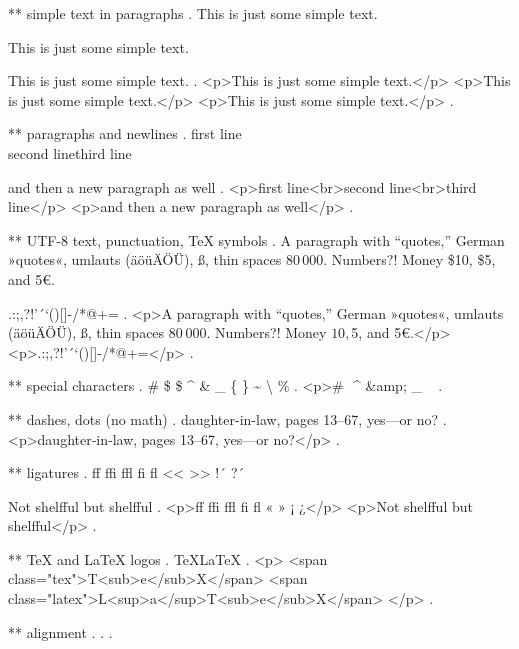 ** simple text in paragraphs
.
This is just some simple text.

This is just some simple text.

This is just some simple text.
.
<p>This is just some simple text.</p>
<p>This is just some simple text.</p>
<p>This is just some simple text.</p>
.

** paragraphs and newlines
.
first line\\second line\newline third line\par and then a new paragraph as well
.
<p>ﬁrst line<br>second line<br>third line</p>
<p>and then a new paragraph as well</p>
.


** UTF-8 text, punctuation, TeX symbols
.
A para\-graph with “quotes,” German »quotes«, umlauts (äöüÄÖÜ), ß, thin spaces 80\,000. Numbers?! Money \$10, \$5, and 5€.

.:;,?!'´`()[]-/*@+=
.
<p>A paragraph with “quotes,” German »quotes«, umlauts (äöüÄÖÜ), ß, thin spaces 80 000. Numbers?! Money $10, $5, and 5€.</p>
<p>.:;,?!'´`()[]‐/*@+=</p>
.


** special characters
.
\# \$ \$ \^{} \& \_ \{ \} \~{} \textbackslash{} \%
.
<p># $ $ ^​ &amp; _ { } ~​ \​ %
.


** dashes, dots (no math)
.
daughter-in-law, pages 13--67, yes---or no?
.
<p>daughter‐in‐law, pages 13–67, yes—or no?</p>
.


** ligatures
.
ff ffi ffl fi fl << >> !´ ?´

Not shelfful but shelf\mbox{}ful
.
<p>ﬀ ﬃ ﬄ ﬁ ﬂ « » ¡ ¿</p>
<p>Not shelﬀul but shelfful</p>
.


** TeX and LaTeX logos
.
\TeX \LaTeX
.
<p>
<span class="tex">T<sub>e</sub>X</span>
<span class="latex">L<sup>a</sup>T<sub>e</sub>X</span>
</p>
.


** alignment
.
.
.

